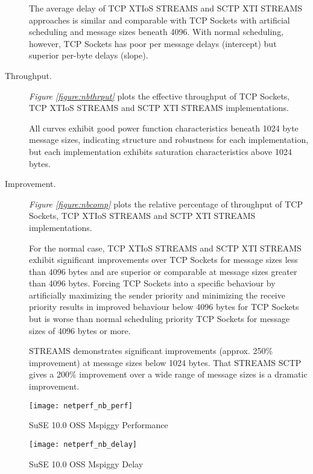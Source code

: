 \documentclass[letterpaper,final,notitlepage,twocolumn,10pt,twoside]{article}
\begin{document}
\begin{description}
The average delay of TCP XTIoS STREAMS and SCTP XTI STREAMS approaches is similar and comparable
with TCP Sockets with artificial scheduling and message sizes beneath 4096.  With normal scheduling,
however, TCP Sockets has poor per message delays (intercept) but superior per-byte delays (slope).

\item[Throughput.]

\textit{Figure \ref{figure:nbthrput}}
plots the effective throughput of TCP Sockets, TCP XTIoS STREAMS and SCTP XTI STREAMS
implementations.

All curves exhibit good power function characteristics beneath 1024 byte message sizes, indicating
structure and robustness for each implementation, but each implementation exhibits saturation
characteristics above 1024 bytes.

\item[Improvement.]

\textit{Figure \ref{figure:nbcomp}}
plots the relative percentage of throughput of TCP Sockets, TCP XTIoS STREAMS and SCTP XTI STREAMS
implementations.

For the normal case, TCP XTIoS STREAMS and SCTP XTI STREAMS exhibit significant improvements over
TCP Sockets for message sizes less than 4096 bytes and are superior or comparable  at message sizes
greater than 4096 bytes.  Forcing TCP Sockets into a specific behaviour by artificially maximizing
the sender priority and minimizing the receive priority results in improved behaviour below 4096
bytes for TCP Sockets but is worse than normal scheduling priority TCP Sockets for message sizes of
4096 bytes or more.

STREAMS demonstrates significant improvements (approx. 250\% improvement) at message sizes below
1024 bytes.  That STREAMS SCTP gives a 200\% improvement over a wide range of message sizes is a
dramatic improvement.

\end{description}

\begin{figure}[p]
\center\texttt{[image: netperf\_nb\_perf]}
\caption[SuSE 10.0 OSS Mspiggy Performance]{SuSE 10.0 OSS Mspiggy Performance}
\label{figure:nbperf}
\end{figure}

\begin{figure}[p]
\center\texttt{[image: netperf\_nb\_delay]}
\caption[SuSE 10.0 OSS Mspiggy Delay]{SuSE 10.0 OSS Mspiggy Delay}
\label{figure:nbdly}
\end{figure}
\end{document}
